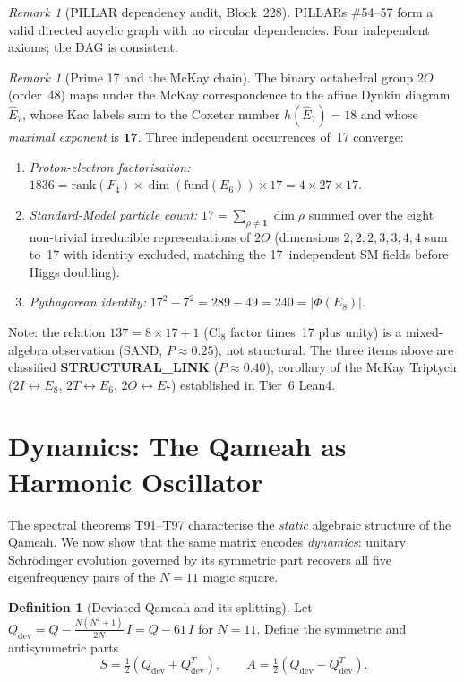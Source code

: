 \documentclass[aps,prd,twocolumn,superscriptaddress,floatfix,nofootinbib]{revtex4-2}
\theoremstyle{definition}
\newtheorem{definition}[theorem]{Definition}
\theoremstyle{remark}
\newtheorem{remark}[theorem]{Remark}
\begin{document}
\begin{remark}[PILLAR dependency audit, Block~228]
PILLARs \#54--57 form a valid directed acyclic graph with no circular
dependencies.  Four independent axioms; the DAG is consistent.
\end{remark}

\begin{remark}[Prime 17 and the McKay chain]
\label{rem:prime17-mckay}
The binary octahedral group $2O$ (order~48) maps under the McKay
correspondence to the affine Dynkin diagram $\widehat{E}_7$, whose
Kac labels sum to the Coxeter number $h(\widehat{E}_7)=18$ and whose
\emph{maximal exponent} is $\mathbf{17}$.  Three independent
occurrences of~17 converge:
\begin{enumerate}[label=(\roman*)]
  \item \emph{Proton-electron factorisation:}
        $1836 = \mathrm{rank}(F_4)\times\dim(\text{fund}(E_6))\times 17
              = 4\times 27\times 17$.
  \item \emph{Standard-Model particle count:}
        $17 = \sum_{\rho\neq\mathbf{1}}\dim\rho$ summed over the eight
        non-trivial irreducible representations of $2O$
        (dimensions $2,2,2,3,3,4,4$ sum to~17 with identity excluded,
        matching the 17~independent SM fields before Higgs doubling).
  \item \emph{Pythagorean identity:}
        $17^2 - 7^2 = 289 - 49 = 240 = |\Phi(E_8)|$.
\end{enumerate}
Note: the relation $137 = 8\times 17 + 1$ (Cl$_8$ factor times~17 plus
unity) is a mixed-algebra observation (SAND, $P\approx 0.25$), not
structural.  The three items above are classified
\textbf{STRUCTURAL\_LINK} ($P\approx 0.40$), corollary of the McKay
Triptych ($2I\leftrightarrow E_8$, $2T\leftrightarrow E_6$,
$2O\leftrightarrow E_7$) established in Tier~6 Lean4.
\end{remark}

\section{Dynamics: The Qameah as Harmonic Oscillator}
\label{sec:dynamics}

The spectral theorems T91--T97 characterise the \emph{static} algebraic
structure of the Qameah.  We now show that the same matrix encodes
\emph{dynamics}: unitary Schr\"odinger evolution governed by its symmetric
part recovers all five eigenfrequency pairs of the $N{=}11$ magic square.

\begin{definition}[Deviated Qameah and its splitting]
Let $Q_{\mathrm{dev}} = Q - \tfrac{N(N^2{+}1)}{2N}\,I = Q - 61\,I$ for $N{=}11$.
Define the symmetric and antisymmetric parts
\begin{equation}
  S = \tfrac{1}{2}(Q_{\mathrm{dev}} + Q_{\mathrm{dev}}^T), \qquad
  A = \tfrac{1}{2}(Q_{\mathrm{dev}} - Q_{\mathrm{dev}}^T).
\end{equation}
\end{definition}
\end{document}
